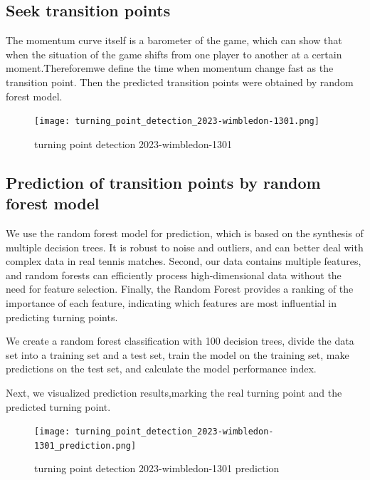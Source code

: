 \documentclass{mcmthesis}  %
\begin{document}
\subsection{Seek  transition points}

\hspace{1.5em} The momentum curve itself is a barometer of the game, which can show that when the situation of the game shifts from one player to another at a certain moment.Thereforemwe define the time when momentum change fast as the transition point. Then the predicted transition points were obtained by random forest model.

\begin{figure}[!htb]  %
\small
\centering  %
\texttt{[image: turning\_point\_detection\_2023-wimbledon-1301.png]}  %
\caption{turning point detection 2023-wimbledon-1301} \label{fig:turning_point_detection_2023-wimbledon-1301.png}  %
\end{figure}  %

\subsection{Prediction of transition points by random forest model}

\hspace{1.5em} We use the random forest model for prediction, which is based on the synthesis of multiple decision trees. It is robust to noise and outliers, and can better deal with complex data in real tennis matches. Second, our data contains multiple features, and random forests can efficiently process high-dimensional data without the need for feature selection. Finally, the Random Forest provides a ranking of the importance of each feature, indicating which features are most influential in predicting turning points.
\par We create a random forest classification with 100 decision trees, divide the data set into a training set and a test set, train the model on the training set, make predictions on the test set, and calculate the model performance index.
\par Next, we visualized prediction results,marking the real turning point and the predicted turning point.

\begin{figure}[!htb]  %
\small
\centering  %
\texttt{[image: turning\_point\_detection\_2023-wimbledon-1301\_prediction.png]}  %
\caption{turning point detection 2023-wimbledon-1301 prediction} \label{fig:turning_point_detection_2023-wimbledon-1301_prediction.png}  %
\end{figure}  %
\end{document}
